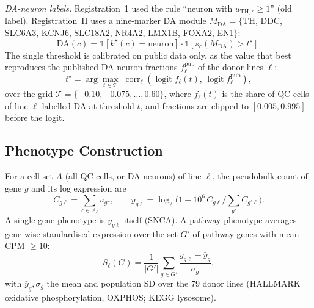 \emph{DA-neuron labels.} Registration~1 used the rule ``neuron with $u_{\mathrm{TH},c} \ge 1$''
(old label). Registration~II uses a nine-marker DA module
$M_{\mathrm{DA}} = \{$TH, DDC, SLC6A3, KCNJ6, SLC18A2, NR4A2, LMX1B, FOXA2, EN1$\}$:
\begin{equation}
\mathrm{DA}(c) = \mathbb{1}\!\left[k^\star(c) = \text{neuron}\right]\cdot
\mathbb{1}\!\left[s_c(M_{\mathrm{DA}}) > t^\star\right].
\label{eq:dalabel}
\end{equation}
The single threshold is calibrated on public data only, as the value that best reproduces the
published DA-neuron fractions $f^{\mathrm{pub}}_\ell$ of the donor lines $\ell$:
\begin{equation}
t^\star = \arg\max_{t \in \mathcal{T}}\;
\operatorname{corr}_\ell\!\left(\operatorname{logit} f_\ell(t),\, \operatorname{logit} f^{\mathrm{pub}}_\ell\right),
\label{eq:calib}
\end{equation}
over the grid $\mathcal{T} = \{-0.10, -0.075, \dots, 0.60\}$, where $f_\ell(t)$ is the share of QC cells of line $\ell$ labelled DA at threshold $t$, and
fractions are clipped to $[0.005, 0.995]$ before the logit.

\subsection{\textbf{Phenotype Construction}}\label{sec:phenotypes}
For a cell set $A$ (all QC cells, or DA neurons) of line $\ell$, the pseudobulk count of gene $g$
and its log expression are
\begin{equation}
C_{g\ell} = \sum_{c \in A_\ell} u_{gc}, \qquad
y_{g\ell} = \log_2\!\Big(1 + 10^6\, C_{g\ell} \big/ \textstyle\sum_{g'} C_{g'\ell}\Big).
\label{eq:pseudobulk}
\end{equation}
A single-gene phenotype is $y_{g\ell}$ itself (SNCA). A pathway phenotype averages gene-wise
standardised expression over the set $G'$ of pathway genes with mean CPM $\ge 10$:
\begin{equation}
S_\ell(G) = \frac{1}{|G'|}\sum_{g \in G'} \frac{y_{g\ell} - \bar{y}_g}{\sigma_g},
\label{eq:geneset}
\end{equation}
with $\bar{y}_g, \sigma_g$ the mean and population SD over the 79 donor lines (HALLMARK oxidative
phosphorylation, OXPHOS; KEGG lysosome).

